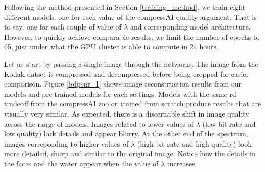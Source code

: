 Following the method presented in Section \ref{training_method}, we train eight different models: one for each value of the compressAI \textsf{quality} argument. That is to say, one for each couple of value of \(\lambda\) and corresponding model architecture. However, to quickly achieve comparable results, we limit the number of epochs to 65, just under what the GPU cluster is able to compute in 24 hours.

Let us start by passing a single image through the networks. The image from the Kodak datset is compressed and decompressed before being cropped for easier comparison. Figure \ref{bdpsnr_1} shows image reconstruction results from our models and pre-trained models for each settings. Models with the same \acrshort{rd} tradeoff from the compressAI zoo or trained from scratch produce results that are visually very similar. As expected, there is a discernable shift in image quality across the range of models. Images related to lower values of \(\lambda\) (low bit rate and low quality) lack details and appear blurry. At the other end of the spectrum, images correponding to higher values of \(\lambda\) (high bit rate and high quality) look more detailed, sharp and similar to the original image. Notice how the details in the faces and the water appear when the value of \(\lambda\) increases.

